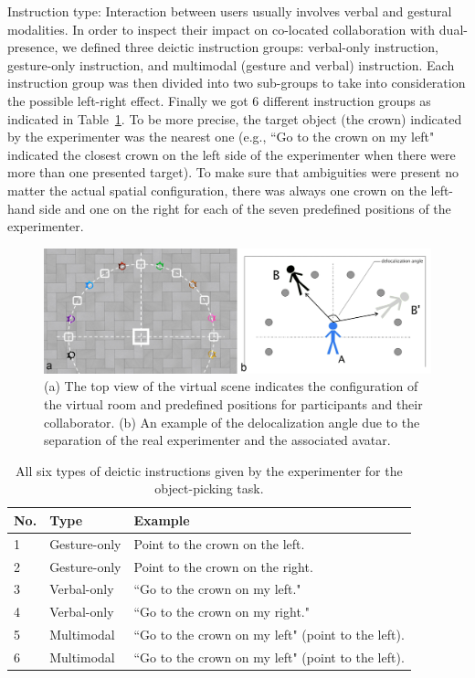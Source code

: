 Instruction type: Interaction between users usually involves verbal and gestural modalities. In order to inspect their impact on co-located collaboration with dual-presence, we defined three deictic instruction groups: verbal-only instruction, gesture-only instruction, and multimodal (gesture and verbal) instruction. Each instruction group was then divided into two sub-groups to take into consideration the possible left-right effect. Finally we got 6 different instruction groups as indicated in Table~\ref{tab:instruction_type}. To be more precise, the target object (the crown) indicated by the experimenter was the nearest one (e.g., ``Go to the crown on my left" indicated the closest crown on the left side of the experimenter when there were more than one presented target). To make sure that ambiguities were present no matter the actual spatial configuration, there was always one crown on the left-hand side and one on the right for each of the seven predefined positions of the experimenter.

\begin{figure}[tb]
  \centering
  \includegraphics[width=\textwidth]{figures/2_floor}
  \caption{\label{fig:2_floor}(a) The top view of the virtual scene indicates the configuration of the virtual room and predefined positions for participants and their collaborator. (b) An example of the delocalization angle due to the separation of the real experimenter and the associated avatar.}
\end{figure}

\begin{table}[!t]
\renewcommand{\arraystretch}{1.3}
\caption{All six types of deictic instructions given by the experimenter for the object-picking task.}
\label{tab:instruction_type}
\centering
\begin{tabular}{l l l}
	\hline
	No. & Type & Example \\
	\hline
    1 & Gesture-only & Point to the crown on the left. \\
    2 & Gesture-only & Point to the crown on the right. \\
    3 & Verbal-only & ``Go to the crown on my left." \\
    4 & Verbal-only & ``Go to the crown on my right." \\
    5 & Multimodal & ``Go to the crown on my left" (point to the left). \\
    6 & Multimodal & ``Go to the crown on my left" (point to the left). \\ \hline
\end{tabular}
\end{table}

